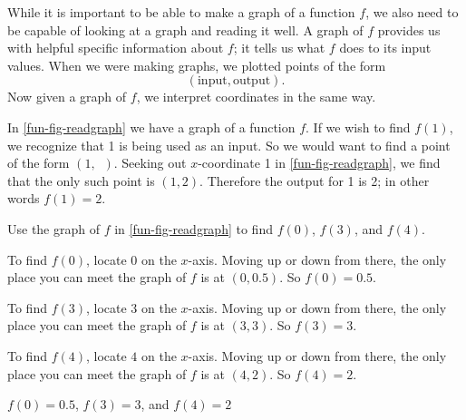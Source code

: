 %
\par While it is important to be able to make a graph of a function $f$, we also need to be capable of looking at a graph and reading it well. 
			A graph of $f$ provides us with helpful specific information about $f$; it tells us what $f$ does to its input values. When we were making graphs, 
			we plotted points of the form \begin{displaymath}(\text{input},\text{output})\text{.}\end{displaymath} Now given a graph of $f$, we interpret coordinates in the same way.
%
\par In \cref{fun-fig-readgraph} we have a graph of a function $f$. If we wish to find $f(1)$, we recognize that \num{1} is being used as an input.
			So we would want to find a point of the form $(1,\phantom{y})$. Seeking out $x$-coordinate \num{1} in \cref{fun-fig-readgraph}, we find that 
			the only such point is $(1,2)$. Therefore the output for \num{1} is \num{2}; in other words $f(1)=2$.
%
\begin{checkpoint}
\begin{problem}\label{}
Use the graph of $f$ in \cref{fun-fig-readgraph} to find $f(0)$, $f(3)$, and $f(4)$.
%
\begin{longsolution}
%
 To find $f(0)$, locate $0$ on the $x$-axis. Moving up or down from there, the only place you can meet the graph
					of $f$ is at $(0,0.5)$. So $f(0)=0.5$.
%
\par  To find $f(3)$, locate $3$ on the $x$-axis. Moving up or down from there, the only place you can meet the graph
                                        of $f$ is at $(3,3)$. So $f(3)=3$.
%
\par  To find $f(4)$, locate $4$ on the $x$-axis. Moving up or down from there, the only place you can meet the graph
                                        of $f$ is at $(4,2)$. So $f(4)=2$.
%

%
\end{longsolution}
%
\begin{shortsolution}
%
$f(0)=0.5$, $f(3)=3$, and $f(4)=2$
					
%
\end{shortsolution}
%
\end{problem}
%
\end{checkpoint}
%
